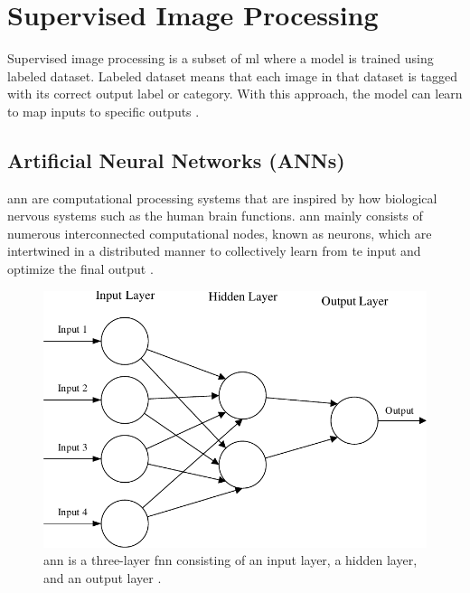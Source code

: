 

\section{Supervised Image Processing}
\label{sec:supervised}

Supervised image processing is a subset of \gls{ml} where a model is trained using labeled dataset. Labeled dataset means that each image in that dataset is tagged with its correct output label or category. With this approach, the model can learn to map inputs to specific outputs \cite{geeksforgeeks-sup-unsup}.

\subsection{Artificial Neural Networks (ANNs)}

\gls{ann} are computational processing systems that are inspired by how biological nervous systems such as the human brain functions. \gls{ann} mainly consists of numerous interconnected computational nodes, known as neurons, which are intertwined in a distributed manner to collectively learn from te input and optimize the final output \cite{oshea2015introductionconvolutionalneuralnetworks}.

\begin{figure}[ht!]
    \centering
    \includegraphics[width=1\linewidth]{Images/ann_architecture.pdf}
    \caption{\gls{ann} is a three-layer \gls{fnn} consisting of an input layer, a hidden layer, and an output layer \cite{oshea2015introductionconvolutionalneuralnetworks}.}
    \label{fig:ann architecture}
\end{figure}

